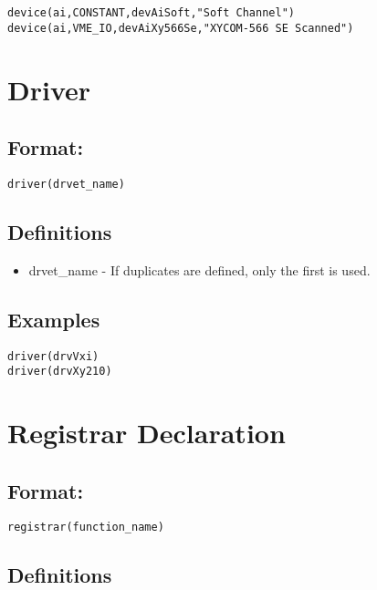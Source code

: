 \begin{verbatim}device(ai,CONSTANT,devAiSoft,"Soft Channel")
device(ai,VME_IO,devAiXy566Se,"XYCOM-566 SE Scanned")
\end{verbatim}\section{Driver}

\subsection{Format:}

\begin{verbatim}driver(drvet_name)
\end{verbatim}\subsection{Definitions}

\begin{itemize}\item {}drvet\_name - If duplicates are defined, only the first is used.

\end{itemize}\subsection{Examples}

\begin{verbatim}driver(drvVxi)
driver(drvXy210)
\end{verbatim}\section{Registrar Declaration}

\subsection{Format:}

\begin{verbatim}registrar(function_name)
\end{verbatim}\subsection{Definitions}

